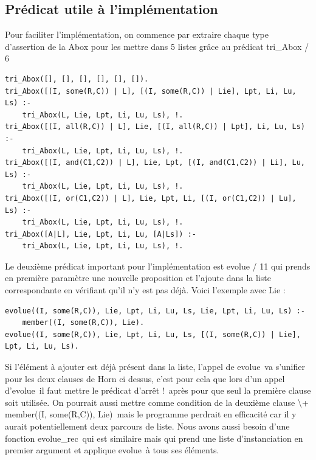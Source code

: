 \documentclass{article}
\begin{document}
\subsection{Prédicat utile à l'implémentation}
Pour faciliter l'implémentation, on commence par extraire chaque type d'assertion de la Abox pour les mettre dans 5 listes grâce au prédicat \color{blue} tri\_Abox / 6 \color{black}
\begin{verbatim}
tri_Abox([], [], [], [], [], []).
tri_Abox([(I, some(R,C)) | L], [(I, some(R,C)) | Lie], Lpt, Li, Lu, Ls) :-
    tri_Abox(L, Lie, Lpt, Li, Lu, Ls), !.
tri_Abox([(I, all(R,C)) | L], Lie, [(I, all(R,C)) | Lpt], Li, Lu, Ls) :-
    tri_Abox(L, Lie, Lpt, Li, Lu, Ls), !.
tri_Abox([(I, and(C1,C2)) | L], Lie, Lpt, [(I, and(C1,C2)) | Li], Lu, Ls) :-
    tri_Abox(L, Lie, Lpt, Li, Lu, Ls), !.
tri_Abox([(I, or(C1,C2)) | L], Lie, Lpt, Li, [(I, or(C1,C2)) | Lu], Ls) :-
    tri_Abox(L, Lie, Lpt, Li, Lu, Ls), !.
tri_Abox([A|L], Lie, Lpt, Li, Lu, [A|Ls]) :-
    tri_Abox(L, Lie, Lpt, Li, Lu, Ls), !.
\end{verbatim}

Le deuxième prédicat important pour l'implémentation est \color{blue} evolue / 11 \color{black} qui prends en première paramètre une nouvelle proposition et l'ajoute dans la liste correspondante en vérifiant qu'il n'y est pas déjà. Voici l'exemple avec Lie :
\begin{verbatim}
evolue((I, some(R,C)), Lie, Lpt, Li, Lu, Ls, Lie, Lpt, Li, Lu, Ls) :-
    member((I, some(R,C)), Lie).
evolue((I, some(R,C)), Lie, Lpt, Li, Lu, Ls, [(I, some(R,C)) | Lie], Lpt, Li, Lu, Ls).
\end{verbatim}
Si l'élément à ajouter est déjà présent dans la liste, l'appel de \color{blue}evolue\color{black}\ va s'unifier pour les deux clauses de Horn ci dessus, c'est pour cela que lors d'un appel d'\color{blue}evolue\color{black}\  il faut mettre le prédicat d'arrêt \color{blue}!\color{black}\ après pour que seul la première clause soit utilisée. On pourrait aussi mettre comme condition de la deuxième clause \color{blue}\textbackslash+ member((I, some(R,C)), Lie)\color{black}\ mais le programme perdrait en efficacité car il y aurait potentiellement deux parcours de liste. Nous avons aussi besoin d'une fonction \color{blue}evolue\_rec\color{black}\ qui est similaire mais qui prend une liste d'instanciation en premier argument et applique \color{blue}evolue\color{black}\ à tous ses éléments.\\
\end{document}
